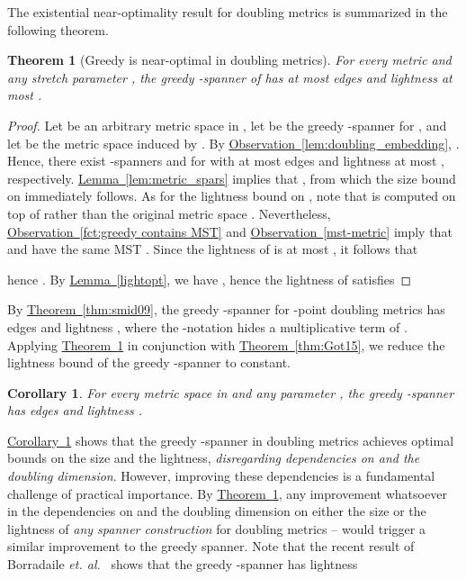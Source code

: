 \documentclass[11pt,letterpaper]{article}
\newtheorem{theorem}{Theorem}
\newtheorem{corollary}{Corollary}
\newcommand{\etal}{\emph{et. al.}}
\newcommand{\namedref}[2]{\hyperref[#2]{#1~\ref*{#2}}}
\newcommand{\theoremref}[1]{\namedref{Theorem}{#1}}
\newcommand{\lemmaref}[1]{\namedref{Lemma}{#1}}
\newcommand{\observationref}[1]{\namedref{Observation}{#1}}
\newcommand{\corollaryref}[1]{\namedref{Corollary}{#1}}
\begin{document}
The existential near-optimality result for doubling metrics is summarized in the following theorem.
\begin{theorem}[Greedy is near-optimal in doubling metrics]\label{theorem:doubling_light}
	For every metric  and any stretch parameter , the greedy -spanner  of 
	has at most  edges and lightness at most .
\end{theorem}
\begin{proof}
	Let  be an arbitrary metric space in , let  be
	the greedy -spanner for ,	and let  be the metric space induced by .	
	By \observationref{lem:doubling_embedding}, .
	Hence, there exist -spanners  and  for  with at most 
	edges and lightness at most , respectively.
	\lemmaref{lem:metric_spars} implies that  , from which the size bound on  immediately follows.
	As for the lightness bound on , note that  is computed on top of  rather than the original metric space .
	Nevertheless, \observationref{fct:greedy contains MST} and \observationref{mst-metric} imply that  and  have the same MST .
	Since the lightness of  is at most , it follows that
	
	hence .
	By \lemmaref{lightopt}, we have , hence the lightness of  satisfies
	
\end{proof}


By \theoremref{thm:smid09}, the greedy -spanner for -point doubling metrics
has  edges and lightness ,
where the -notation hides a multiplicative term of .
Applying \theoremref{theorem:doubling_light} in conjunction with  \theoremref{thm:Got15}, we reduce the lightness bound of the greedy -spanner to constant.
\begin{corollary}\label{cor:Greedy_G}
	For every metric space   in  and any parameter ,  the greedy -spanner has
	  edges and lightness .
\end{corollary}
\corollaryref{cor:Greedy_G} shows that the greedy -spanner in doubling metrics achieves optimal bounds on the size and the lightness, \emph{disregarding dependencies on  and the doubling dimension}.
However, improving these dependencies is a fundamental challenge of practical importance.
By \theoremref{theorem:doubling_light}, any improvement whatsoever in the dependencies on  and the doubling dimension
on either the size or the lightness of \emph{any spanner construction} for doubling metrics -- would trigger a similar improvement to the greedy spanner.
Note that the recent result of Borradaile \etal ~\cite{BLW19} shows that the greedy -spanner has lightness  
\end{document}
